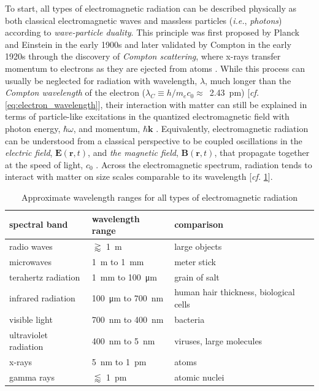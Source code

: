 To start, all types of electromagnetic radiation can be described physically as both classical electromagnetic waves and massless particles (\emph{i.e.}, \emph{photons}) according to \emph{wave-particle duality}. 
This principle was first proposed by Planck and Einstein in the early 1900s \cite{Planck1901,Einstein1905a} and later validated by Compton in the early 1920s through the discovery of \emph{Compton scattering}, where x-rays transfer momentum to electrons as they are ejected from atoms \cite{Compton23a,Als-Nielsen11}. 
While this process can usually be neglected for radiation with wavelength, $\lambda$, much longer than the \emph{Compton wavelength} of the electron ($\lambda_C \equiv h / m_e c_0 \approx$~\SI{2.43}{\pico\metre}) [\emph{cf.\@} \cref{eq:electron_wavelength}], their interaction with matter can still be explained in terms of particle-like excitations in the quantized electromagnetic field with photon energy, $\hbar \omega$, and momentum, $\hbar \mathbold{k}$ \cite{Townsend00,Shankar04}. 
Equivalently, electromagnetic radiation can be understood from a classical perspective to be coupled oscillations in the \emph{electric field}, $\mathbold{E}(\mathbold{r},t)$, and \emph{the magnetic field}, $\mathbold{B}(\mathbold{r},t)$, that propagate together at the speed of light, $c_0$ \cite{Jackson75,Born80}. 
Across the electromagnetic spectrum, radiation tends to interact with matter on size scales comparable to its wavelength [\emph{cf.\@} \cref{tab:EM_spectrum}]. 
\begin{table}[]
 \centering
 \caption{Approximate wavelength ranges for all types of electromagnetic radiation}\label{tab:EM_spectrum}
 \begin{tabular}{@{}lll@{}} 
 \toprule
 spectral band & wavelength range & comparison \\ \midrule 
 radio waves & $\gtrapprox$ \SI{1}{\metre} & large objects \\ 
 microwaves & \SI{1}{\metre} to \SI{1}{\milli\metre} & meter stick \\ 
 terahertz radiation & \SI{1}{\milli\metre} to \SI{100}{\micro\metre} & grain of salt \\ 
 infrared radiation & \SI{100}{\micro\metre} to \SI{700}{\nano\metre} & human hair thickness, biological cells \\ 
 visible light & \SI{700}{\nano\metre} to \SI{400}{\nano\metre} & bacteria \\ 
 ultraviolet radiation & \SI{400}{\nano\metre} to \SI{5}{\nano\metre} & viruses, large molecules \\ 
 x-rays & \SI{5}{\nano\metre} to \SI{1}{\pico\metre} & atoms \\
 gamma rays &  $\lessapprox$ \SI{1}{\pico\metre} & atomic nuclei \\ 
 \bottomrule
 \end{tabular}
 \end{table}
